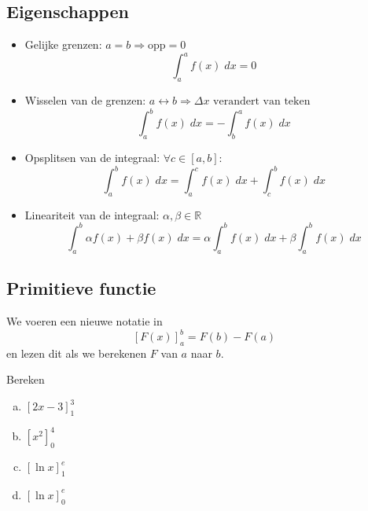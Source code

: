 \documentclass[a4paper,12pt, twoside]{article}
\begin{document}
\subsection{Eigenschappen}

\begin{itemize}
  \item Gelijke grenzen: $a=b \Rightarrow \mbox{opp}=0$
  $$\int_a^a f(x)\;dx = 0$$
  \item Wisselen van de grenzen: $a\leftrightarrow b \Rightarrow \Delta x \mbox{ verandert van teken}$
  $$\int_a^b f(x)\;dx = -\int_b^a f(x)\;dx$$
  \item Opsplitsen van de integraal: $\forall c\in[a,b]:$
  $$\int_a^b f(x)\;dx = \int_a^c f(x)\;dx + \int_c^b f(x)\;dx$$
  \item Lineariteit van de integraal: $\alpha, \beta\in\mathbb{R}$
  $$\int_a^b \alpha f(x) + \beta f(x)\;dx = \alpha \int_a^b f(x) \;dx+ \beta \int_a^b f(x)\;dx$$
\end{itemize}

\subsection{Primitieve functie}

We voeren een nieuwe notatie in
$$[F(x)]_a^b = F(b) - F(a)$$
en lezen dit als we berekenen $F$ van $a$ naar $b$.

\begin{oefening}
Bereken
\begin{multicols}{2}
\begin{enumerate}[(a)]
  \itemsep.5em
  \item $\displaystyle\left[2x-3\right]_1^3$
  \item $\displaystyle\left[x^2\right]_0^4$
  \item $\displaystyle\left[\ln x\right]_1^e$
  \item $\displaystyle\left[\ln x\right]_0^e$
\end{enumerate}
\end{multicols}
\end{oefening}
\end{document}
